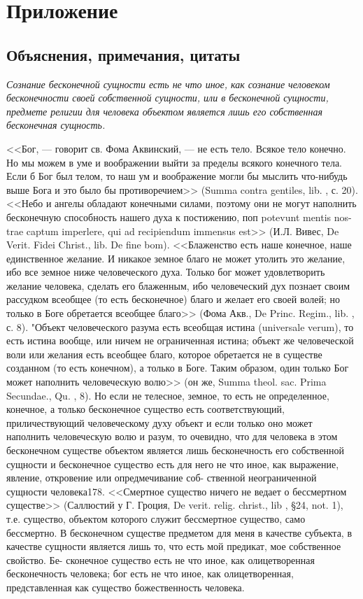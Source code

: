 \documentclass[12pt,oneside]{book}
\newcommand{\rom}[1]{\uppercase\expandafter{\romannumeral #1\relax}}
\begin{document}
\part{Приложение}

\chapter{Объяснения, примечания, цитаты}

\emph{Сознание бесконечной сущности есть не что иное, как сознание человеком бесконечности своей собственной сущности, или в бесконечной сущности, предмете религии для человека объектом является лишь его собственная бесконечная сущность.}

<<Бог, --- говорит св. Фома Аквинский, --- не есть тело. Всякое тело конечно. Но мы можем в уме и воображении выйти за пределы всякого конечного тела. Если б Бог был телом, то наш ум и воображение могли бы мыслить что-нибудь выше Бога и это было бы противоречием>> (Summa contra gentiles, lib. \rom{1}, с. 20). <<Небо и ангелы обладают конечными силами, поэтому они не могут наполнить бесконечную способность нашего духа к постижению, поп potevunt mentis nos- trae captum imperlere, qui ad recipiendum immensus est>> (И.Л. Вивес, De Verit. Fidei Christ., lib. \rom{1} De fine bom). <<Блаженство есть наше конечное, наше единственное желание. И никакое земное благо не может утолить это желание, ибо все земное ниже человеческого духа. Только бог может удовлетворить желание человека, сделать его блаженным, ибо человеческий дух познает своим рассудком всеобщее (то есть бесконечное) благо и желает его своей волей; но только в Боге обретается всеобщее благо>> (Фома Акв., De Princ. Regim., lib. \rom{1}, с. 8). "Объект человеческого разума есть всеобщая истина (universale verum), то есть истина вообще, или ничем не ограниченная истина; объект же человеческой воли или желания есть всеобщее благо, которое обретается не в существе созданном (то есть конечном), а только в Боге. Таким образом, один только Бог может наполнить человеческую волю>> (он же, Summa theol. sac. Prima Secundae., Qu. \rom{2}, 8). Но если не телесное, земное, то есть не определенное, конечное, а только бесконечное существо есть соответствующий, приличествующий человеческому духу объект и если только оно может наполнить человеческую волю и разум, то очевидно, что для человека в этом бесконечном существе объектом является лишь бесконечность его собственной сущности и бесконечное существо есть для него не что иное, как выражение, явление, откровение или опредмечивание соб- ственной неограниченной сущности человека178.
<<Смертное существо ничего не ведает о бессмертном существе>> (Саллюстий у Г. Гроция, De verit. relig. christ., lib \rom{1}, \S 24, not. 1), т.е. существо, объектом которого служит бессмертное существо, само бессмертно. В бесконечном существе предметом для меня в качестве субъекта, в качестве сущности является лишь то, что есть мой предикат, мое собственное свойство. Бе- сконечное существо есть не что иное, как олицетворенная бесконечность человека; бог есть не что иное, как олицетворенная, представленная как существо божественность человека.
\end{document}
